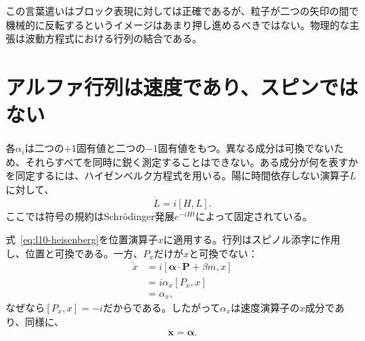 この言葉遣いはブロック表現に対しては正確であるが、粒子が二つの矢印の間で機械的に反転するというイメージはあまり押し進めるべきではない。物理的な主張は波動方程式における行列の結合である。

\begin{classroomqa}
\end{classroomqa}

\begin{classroomqa}
\end{classroomqa}

\section{アルファ行列は速度であり、スピンではない}

各\(\alpha_i\)は二つの\(+1\)固有値と二つの\(-1\)固有値をもつ。異なる成分は可換でないため、それらすべてを同時に鋭く測定することはできない。ある成分が何を表すかを同定するには、ハイゼンベルク方程式を用いる。陽に時間依存しない演算子\(L\)に対して、
\begin{equation}
\dot L=i[H,L].
\label{eq:l10-heisenberg}
\end{equation}
ここでは符号の規約はSchr\"odinger発展\(e^{-iHt}\)によって固定されている。

式~\eqref{eq:l10-heisenberg}を位置演算子\(x\)に適用する。行列はスピノル添字に作用し、位置と可換である。一方、\(P_x\)だけが\(x\)と可換でない：
\begin{align}
\dot x
&=i[\boldsymbol{\alpha}\cdot\mathbf P+\beta m,x]\\
&=i\alpha_x[P_x,x]\\
&=\alpha_x,
\label{eq:l10-velocity}
\end{align}
なぜなら\([P_x,x]=-i\)だからである。したがって\(\alpha_x\)は速度演算子の\(x\)成分であり、同様に、
\begin{equation}
\dot{\mathbf x}=\boldsymbol{\alpha}.
\end{equation}

